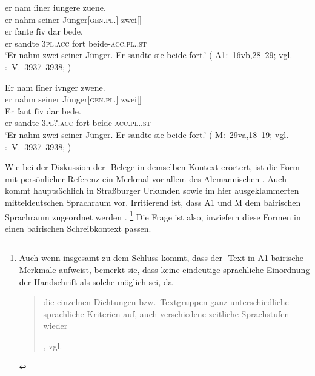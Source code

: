 \begin{exe}
\ex \label{ex:siubedea1m}
	\begin{xlist}
	\ex \label{ex:siubedea1m_1}
		\gll er nam ſiner iungere zuene. \\
			er nahm seiner Jünger[\textsc{gen.pl.\MascM}] zwei[\MascM] \\
	\sn \gll er ſante ſiv dar bede. \\
			er sandte \textsc{3pl\subM.acc} fort beide-\textsc{acc.pl.\MascM.st} \\
		\trans `Er nahm zwei seiner Jünger. Er sandte sie beide fort.'
			(%
				A1:~16vb,28--29; vgl.
				\KC:~V.~3937--3938;
				\cite[153]{schroeder1895}%
			)
	
	\ex \label{ex:siubedea1m_2}
		\gll Er nam ſíner ivnger zwene. \\
			er nahm seiner Jünger[\textsc{gen.pl.\MascM}] zwei[\MascM] \\
	\sn \gll Er ſant ſiv dar bede. \\
			er sandte \textsc{3pl\subM?.acc} fort beide-\textsc{acc.pl.\MascM.st} \\
		\trans `Er nahm zwei seiner Jünger. Er sandte sie beide fort.'
			(%
				M:~29va,18--19; vgl.
				\KC:~V.~3937--3938;
				\cite[153]{schroeder1895}%
			)
\end{xlist}
\end{exe}

Wie bei der Diskussion der \CAO{}-Belege in demselben Kontext erörtert, ist die
Form  mit persönlicher Referenz ein Merkmal vor allem des
Alemannischen \autocite[vgl.][395]{ksw2}. Auch
 kommt hauptsächlich in Straßburger Urkunden sowie im hier
ausgeklammerten mitteldeutschen Sprachraum vor. Irritierend
ist, dass A1 und M dem bairischen Sprachraum zugeordnet werden
\autocites{wolf:kckat}[266--276]{fleischer2019}.%
%
	\footnote{Auch wenn \citet[40--41]{schneider1987} insgesamt zu dem Schluss
		kommt, dass der \KC{}-Text in A1 bairische
		Merkmale aufweist, bemerkt sie, dass keine eindeutige sprachliche
		Einordnung der Handschrift als solche möglich sei, da
		\blockquote[{\cite[40]{schneider1987},
		vgl.~\nosh\cites[519]{gaertner1999}[1638]{2vl11}}]{die einzelnen
		Dichtungen bzw.\ Textgruppen ganz unterschiedliche sprachliche
		Kriterien auf, \textelp{} auch verschiedene zeitliche
		Sprachstufen wieder }.%
	}
%
Die Frage ist also, inwiefern diese Formen in einen
bairischen Schreib\-kontext passen.

